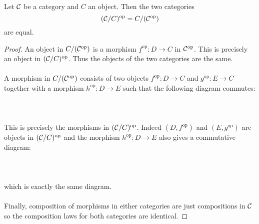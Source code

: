 \documentclass[a4paper]{article}
\begin{document}
\begin{prp}{}{} Let $\mathcal{C}$ be a category and $C$ an object. Then the two categories $$(\mathcal{C}/C)^\text{op}=C/(\mathcal{C}^\text{op})$$ are equal. \tcbline
\begin{proof}
An object in $C/(\mathcal{C}^\text{op})$ is a morphism $f^\text{op}:D\to C$ in $\mathcal{C}^\text{op}$. This is precisely an object in $(\mathcal{C}/C)^\text{op}$. Thus the objects of the two categories are the same. \\~\\

A morphism in $C/(\mathcal{C}^\text{op})$ consists of two objects $f^\text{op}:D\to C$ and $g^\text{op}:E\to C$ together with a morphism $h^\text{op}:D\to E$ such that the following diagram commutes: \\~\\
\\~\\
This is precisely the morphisms in $(\mathcal{C}/C)^\text{op}$. Indeed $(D,f^\text{op})$ and $(E,g^\text{op})$ are objects in $(\mathcal{C}/C)^\text{op}$ and the morphism $h^\text{op}:D\to E$ also gives a commutative diagram: \\~\\
\\~\\
which is exactly the same diagram. \\~\\

Finally, composition of morphisms in either categories are just compositions in $\mathcal{C}$ so the composition laws for both categories are identical. 
\end{proof}
\end{prp}
\end{document}
